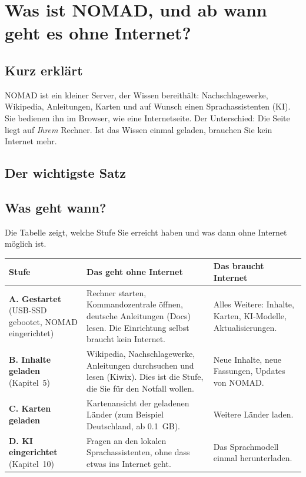\chapter{Was ist NOMAD, und ab wann geht es ohne Internet?}

\section{Kurz erklärt}
NOMAD ist ein kleiner Server, der Wissen bereithält: Nachschlagewerke, Wikipedia, Anleitungen, Karten und auf Wunsch einen Sprachassistenten (KI). Sie bedienen ihn im Browser, wie eine Internetseite. Der Unterschied: Die Seite liegt auf \emph{Ihrem} Rechner. Ist das Wissen einmal geladen, brauchen Sie kein Internet mehr.


\section{Der wichtigste Satz}

\section{Was geht wann?}
Die Tabelle zeigt, welche Stufe Sie erreicht haben und was dann ohne Internet möglich ist.

\renewcommand{\arraystretch}{1.35}
\begin{center}
\small
\begin{tabularx}{\linewidth}{>{\RaggedRight\arraybackslash}p{3.4cm}>{\RaggedRight\arraybackslash}X>{\RaggedRight\arraybackslash}X}
\toprule
\textbf{Stufe} & \textbf{Das geht ohne Internet} & \textbf{Das braucht Internet} \\
\midrule
\textbf{A. Gestartet} (USB-SSD gebootet, NOMAD eingerichtet) &
Rechner starten, Kommandozentrale öffnen, deutsche Anleitungen (Docs) lesen. Die Einrichtung selbst braucht kein Internet. &
Alles Weitere: Inhalte, Karten, KI-Modelle, Aktualisierungen. \\
\addlinespace
\textbf{B. Inhalte geladen} (Kapitel~5) &
Wikipedia, Nachschlagewerke, Anleitungen durchsuchen und lesen (Kiwix). Dies ist die Stufe, die Sie für den Notfall wollen. &
Neue Inhalte, neue Fassungen, Updates von NOMAD. \\
\addlinespace
\textbf{C. Karten geladen} &
Kartenansicht der geladenen Länder (zum Beispiel Deutschland, ab \SI{0,1}{GB}). &
Weitere Länder laden. \\
\addlinespace
\textbf{D. KI eingerichtet} (Kapitel~10) &
Fragen an den lokalen Sprachassistenten, ohne dass etwas ins Internet geht. &
Das Sprachmodell einmal herunterladen. \\
\bottomrule
\end{tabularx}
\end{center}

